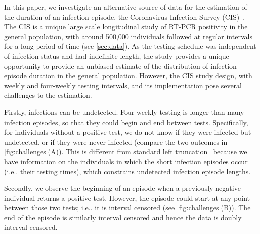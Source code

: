 \documentclass[12pt]{article}
\makeatletter
\DeclareRobustCommand\onedot{\futurelet\@let@token\@onedot}
\def\@onedot{\ifx\@let@token.\else.\null\fi\xspace}
\def\ie{i.e\onedot} \def\Ie{{I.e}\onedot}
\makeatother
\begin{document}
In this paper, we investigate an alternative source of data for the estimation of the duration of an infection episode, the Coronavirus Infection Survey (CIS)~\citep{CIS}.
The CIS is a unique large scale longitudinal study of RT-PCR positivity in the general population, with around 500,000 individuals followed at regular intervals for a long period of time (see \cref{sec:data}).
As the testing schedule was independent of infection status and had indefinite length, the study provides a unique opportunity to provide an unbiased estimate of the distribution of infection episode duration in the general population.
However, the CIS study design, with weekly and four-weekly testing intervals, and its implementation pose several challenges to the estimation.

Firstly, infections can be undetected.
Four-weekly testing is longer than many infection episodes, so that they could begin and end between tests.
Specifically, for individuals without a positive test, we do not know if they were infected but undetected, or if they were never infected (compare the two outcomes in \cref{fig:challenges}(A)).
This is different from standard left truncation~\cite[e.g.][]{sunEmpirical,bacchettiNonparametric} because we have information on the individuals in which the short infection episodes occur (\ie their testing times), which constrains undetected infection episode lengths.

Secondly, we observe the beginning of an episode when a previously negative individual returns a positive test.
However, the episode could start at any point between those two tests; \ie it is interval censored (see \cref{fig:challenges}(B)).
The end of the episode is similarly interval censored and hence the data is doubly interval censored.
\end{document}

